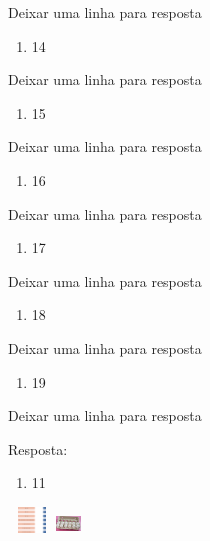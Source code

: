 Deixar uma linha para resposta

\begin{enumerate}
\def\labelenumi{\alph{enumi})}
\item
  14
\end{enumerate}

Deixar uma linha para resposta

\begin{enumerate}
\def\labelenumi{\alph{enumi})}
\item
  15
\end{enumerate}

Deixar uma linha para resposta

\begin{enumerate}
\def\labelenumi{\alph{enumi})}
\item
  16
\end{enumerate}

Deixar uma linha para resposta

\begin{enumerate}
\def\labelenumi{\alph{enumi})}
\item
  17
\end{enumerate}

Deixar uma linha para resposta

\begin{enumerate}
\def\labelenumi{\alph{enumi})}
\item
  18
\end{enumerate}

Deixar uma linha para resposta

\begin{enumerate}
\def\labelenumi{\alph{enumi})}
\item
  19
\end{enumerate}

Deixar uma linha para resposta

Resposta:

\begin{enumerate}
\def\labelenumi{\alph{enumi})}
\item
  11
\end{enumerate}

\includegraphics[width=0.50004in,height=0.26669in]{media/image14.png}\includegraphics[width=0.25836in,height=0.18335in]{media/image15.png}


